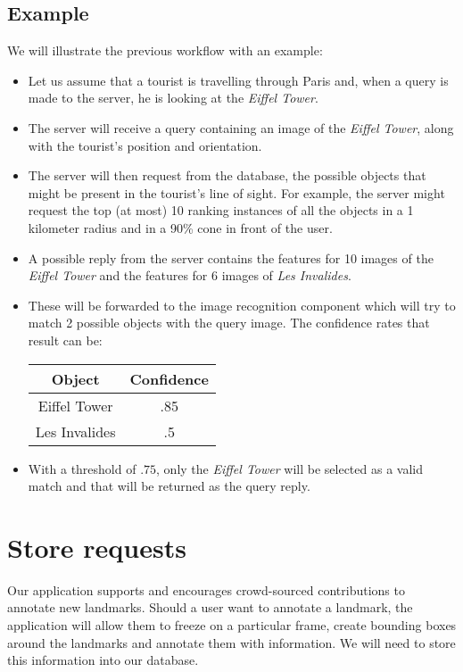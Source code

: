 \documentclass[a4paper,onecolumn,oneside,titlepage,12pt]{report}
\begin{document}
\subsection*{Example}
We will illustrate the previous workflow with an example:
\begin{itemize}
	\item Let us assume that a tourist is travelling through Paris and, when a query is made to the server, he is looking at the \emph{Eiffel Tower}.
	\item The server will receive a query containing an image of the \emph{Eiffel Tower}, along with the tourist's position and orientation. 
	\item The server will then request from the database, the possible objects that might be present in the tourist's line of sight. For example, the server might request the top (at most) 10 ranking instances of all the objects in a 1 kilometer radius and in a 90\% cone in front of the user.
	\item A possible reply from the server contains the features for 10 images of the \emph{Eiffel Tower} and the features for 6 images of \emph{Les Invalides}.
	\item These will be forwarded to the image recognition component which will try to match 2 possible objects with the query image. The confidence rates that result can be:
		\begin{center}
			\begin{tabular}{|c|c|}
				\hline
				\textbf{Object} & \textbf{Confidence}\\
				\hline
				Eiffel Tower & .85\\
				Les Invalides & .5\\
				\hline
			\end{tabular}
		\end{center}
	\item With a threshold of $.75$, only the \emph{Eiffel Tower} will be selected as a valid match and that will be returned as the query reply.
\end{itemize}

\section{Store requests}
Our application supports and encourages crowd-sourced contributions to annotate new landmarks. Should a user want to annotate a landmark, the application will allow them to freeze on a particular frame, create  bounding boxes around the landmarks and annotate them with information. We will need to store this information into our database.
\end{document}
